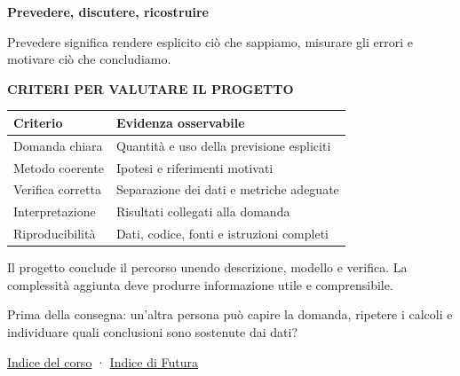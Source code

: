 \documentclass[12pt,aspectratio=1610]{beamer}
\newcommand{\PLabel}[1]{\par{\color{Classical}\bfseries\fontsize{9}{11}\selectfont\MakeUppercase{#1}}\par\vspace{1.8mm}}
\newcommand{\PBody}[1]{\par{\fontsize{11.3}{14.8}\selectfont #1\par}}
\newcommand{\PSmall}[1]{\par{\fontsize{9.8}{13.1}\selectfont #1\par}}
\newcommand{\PInfo}[1]{%
\begin{tcolorbox}[enhanced,arc=1.6mm,boxrule=.55pt,colback=GeoTint,
 colframe=Rule!80!Classical,left=2.3mm,right=2.3mm,top=2mm,bottom=2mm,
 before skip=1mm,after skip=1mm]
\PSmall{#1}\end{tcolorbox}}
\begin{document}
\begin{frame}[plain]\hypertarget{slide110}{}
\begin{lrbox}{\TitleBox}
\begin{minipage}[t]{17.7cm}\raggedright\color{Ink}\fontsize{11.3}{14.8}\selectfont
\color{Navy}\bfseries\fontsize{20.6}{24.5}\selectfont Prevedere, discutere, ricostruire
\end{minipage}\end{lrbox}

\begin{lrbox}{\RecallBox}
\begin{minipage}[t]{14.3cm}\raggedright\color{Ink}\fontsize{11.3}{14.8}\selectfont
\fontsize{10.3}{13.8}\selectfont Prevedere significa rendere esplicito ciò che sappiamo, misurare gli errori e motivare ciò che concludiamo.
\end{minipage}\end{lrbox}

\begin{lrbox}{\PilotLeftBox}
\begin{minipage}[t]{10.05cm}\raggedright\color{Ink}\fontsize{11.3}{14.8}\selectfont
\PLabel{Criteri per valutare il progetto}
{\fontsize{10.2}{13.1}\selectfont\renewcommand{\arraystretch}{1.45}\begin{tabular}{@{}p{3.6cm}p{5.5cm}@{}}\toprule
\textbf{Criterio} & \textbf{Evidenza osservabile}\\\midrule
Domanda chiara & Quantità e uso della previsione espliciti\\
Metodo coerente & Ipotesi e riferimenti motivati\\
Verifica corretta & Separazione dei dati e metriche adeguate\\
Interpretazione & Risultati collegati alla domanda\\
Riproducibilità & Dati, codice, fonti e istruzioni completi\\
\bottomrule\end{tabular}}

\end{minipage}\end{lrbox}

\begin{lrbox}{\PilotRightBox}
\begin{minipage}[t]{7.55cm}\raggedright\color{Ink}\fontsize{11.3}{14.8}\selectfont
\PBody{Il progetto conclude il percorso unendo descrizione, modello e verifica. La complessità aggiunta deve produrre informazione utile e comprensibile.}
\vspace{2.5mm}
\PInfo{Prima della consegna: un’altra persona può capire la domanda, ripetere i calcoli e individuare quali conclusioni sono sostenute dai dati?}
\PSmall{\href{https://marzione00.github.io/Lab_Geo/\#indice}{Indice del corso} · \hyperlink{slide2}{Indice di Futura}}


\end{minipage}
\end{lrbox}
\end{frame}
\end{document}

